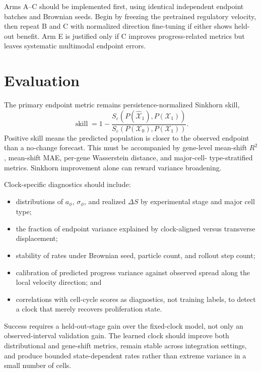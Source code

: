 \documentclass[11pt]{article}
\begin{document}
Arms A--C should be implemented first, using identical independent endpoint
batches and Brownian seeds. Begin by freezing the pretrained regulatory
velocity, then repeat B and C with normalized direction fine-tuning if either
shows held-out benefit. Arm E is justified only if C improves progress-related
metrics but leaves systematic multimodal endpoint errors.

\section{Evaluation}

The primary endpoint metric remains persistence-normalized Sinkhorn skill,
\begin{equation}
  \operatorname{skill}
  =1-\frac{S_\varepsilon(P(\widehat{\mathcal X}_1),P(\mathcal X_1))}
           {S_\varepsilon(P(\mathcal X_0),P(\mathcal X_1))}.
  \label{eq:skill}
\end{equation}
Positive skill means the predicted population is closer to the observed
endpoint than a no-change forecast. This must be accompanied by gene-level
mean-shift $R^2$, mean-shift MAE, per-gene Wasserstein distance, and major-cell-
type-stratified metrics. Sinkhorn improvement alone can reward variance
broadening.

Clock-specific diagnostics should include:
\begin{itemize}
  \item distributions of $a_\phi$, $\sigma_\phi$, and realized $\Delta S$ by
        experimental stage and major cell type;
  \item the fraction of endpoint variance explained by clock-aligned versus
        transverse displacement;
  \item stability of rates under Brownian seed, particle count, and rollout
        step count;
  \item calibration of predicted progress variance against observed spread
        along the local velocity direction; and
  \item correlations with cell-cycle scores as diagnostics, not training
        labels, to detect a clock that merely recovers proliferation state.
\end{itemize}

Success requires a held-out-stage gain over the fixed-clock model, not only an
observed-interval validation gain. The learned clock should improve both
distributional and gene-shift metrics, remain stable across integration
settings, and produce bounded state-dependent rates rather than extreme
variance in a small number of cells.
\end{document}
